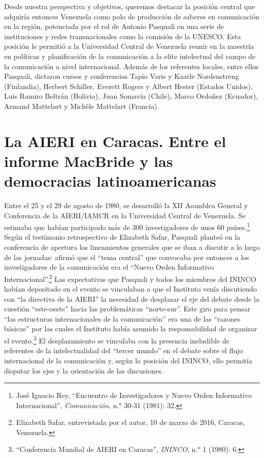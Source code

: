 \documentclass{tufte-handout}
\begin{document}
Desde nuestra perspectiva y objetivos, queremos destacar la posición
central que adquiría entonces Venezuela como polo de producción de
saberes en comunicación en la región, potenciada por el rol de Antonio
Pasquali en una serie de instituciones y redes transnacionales como la
comisión de la UNESCO. Esta posición le permitió a la Universidad
Central de Venezuela reunir en la maestría en políticas y planificación
de la comunicación a la elite intelectual del campo de la comunicación a
nivel internacional. Además de los referentes locales, entre ellos
Pasquali, dictaron cursos y conferencias Tapio Varis y Kaarle
Nordenstreng (Finlandia), Herbert Schiller, Everett Rogers y Albert
Hester (Estados Unidos), Luis Ramiro Beltrán (Bolivia), Juan Somavía
(Chile), Marco Ordoñez (Ecuador), Armand Mattelart y Michèle Mattelart
(Francia).

\hypertarget{la-aieri-en-caracas-entre-el-informe-macbride-y-las-democracias-latinoamericanas}{%
\section{La AIERI en Caracas. Entre el informe MacBride y las\\\noindent
democracias
latinoamericanas}\label{la-aieri-en-caracas-entre-el-informe-macbride-y-las-democracias-latinoamericanas}}

Entre el 25 y el 29 de agosto de 1980, se desarrolló la XII Asamblea
General y Conferencia de la AIERI/IAMCR en la Universidad Central de
Venezuela. Se estimaba que habían participado más de 300 investigadores
de unos 60 países.\footnote{José Ignacio Rey, ``Encuentro de
  Investigadores y Nuevo Orden Informativo Internacional'',
  \emph{Comunicación}, n.° 30-31 (1981): 32.} Según el testimonio
retrospectivo de Elizabeth Safar, Pasquali planteó en la conferencia de
apertura los lineamientos generales que se iban a discutir a lo largo de
las jornadas: afirmó que el ``tema central'' que convocaba por entonces
a los investigadores de la comunicación era el ``Nuevo Orden Informativo
Internacional''.\footnote{Elizabeth Safar, entrevistada por el autor, 10
  de marzo de 2016, Caracas, Venezuela.} Las expectativas que Pasquali y
todos los miembros del ININCO habían depositado en el evento se
vinculaban a que el Instituto venía discutiendo con ``la directiva de la
AIERI'' la necesidad de desplazar el eje del debate desde la cuestión
``este-oeste'' hacia las problemáticas ``norte-sur''. Este giro para
pensar ``las estructuras internacionales de la comunicación'' era una de
las ``razones básicas'' por las cuales el Instituto había asumido la
responsabilidad de organizar el evento.\footnote{``Conferencia Mundial
  de AIERI en Caracas'', \emph{ININCO}, n.° 1 (1980): 6.} El
desplazamiento se vinculaba con la presencia ineludible de referentes de
la intelectualidad del ``tercer mundo'' en el debate sobre el flujo
internacional de la comunicación y, según la posición del ININCO, ello
permitía disputar los ejes y la orientación de las discusiones.
\end{document}
